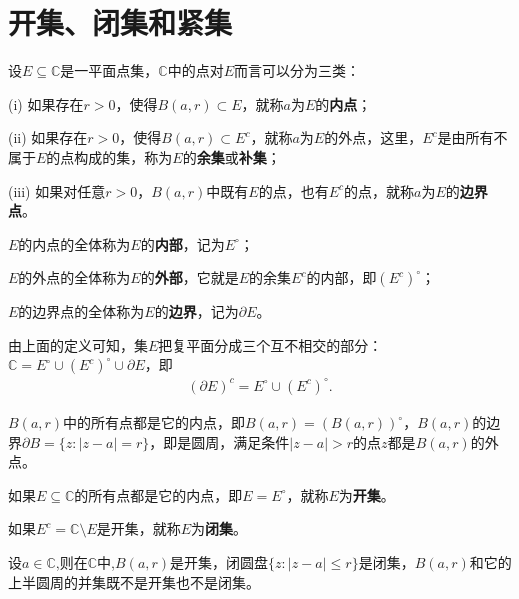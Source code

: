 \documentclass[../../main.tex]{subfiles}%
\begin{document}
\section{开集、闭集和紧集}

\begin{definition}
设\(E\subseteq \mathbb{C}\)是一平面点集，\(\mathbb{C}\)中的点对\(E\)而言可以分为三类：

(i) 如果存在\(r > 0\)，使得\(B(a, r) \subset E\)，就称\(a\)为\(E\)的\textbf{内点}；

(ii) 如果存在\(r > 0\)，使得\(B(a, r) \subset E^c\)，就称\(a\)为\(E\)的外点，这里，\(E^c\)是由所有不属于\(E\)的点构成的集，称为\(E\)的\textbf{余集}或\textbf{补集}；

(iii) 如果对任意\(r > 0\)，\(B(a, r)\)中既有\(E\)的点，也有\(E^c\)的点，就称\(a\)为\(E\)的\textbf{边界点}。

\(E\)的内点的全体称为\(E\)的\textbf{内部}，记为\(E^\circ\)；

\(E\)的外点的全体称为\(E\)的\textbf{外部}，它就是\(E\)的余集\(E^c\)的内部，即\((E^c)^\circ\)；

\(E\)的边界点的全体称为\(E\)的\textbf{边界}，记为\(\partial E\)。
\end{definition}
\begin{remark}
由上面的定义可知，集\(E\)把复平面分成三个互不相交的部分：\(\mathbb{C} = E^\circ \cup (E^c)^\circ \cup \partial E\)，即
\begin{align}\label{equation:::2318}
(\partial E)^c = E^\circ \cup (E^c)^\circ. 
\end{align}
\end{remark}

\begin{example}[邻域的内部和边界]
\(B(a, r)\)中的所有点都是它的内点，即\(B(a, r) = (B(a, r))^\circ\)，\(B(a, r)\)的边界\(\partial B = \{ z : | z - a | = r \}\)，即是圆周，满足条件\(| z - a | > r\)的点\(z\)都是\(B(a, r)\)的外点。
\end{example}

\begin{definition}
如果\(E\subseteq \mathbb{C}\)的所有点都是它的内点，即\(E = E^\circ\)，就称\(E\)为\textbf{开集}。

如果\(E^c=\mathbb{C}\setminus E\)是开集，就称\(E\)为\textbf{闭集}。
\end{definition}

\begin{example}
设$a\in \mathbb{C}$,则在$\mathbb{C}$中,\(B(a, r)\)是开集，闭圆盘\(\{ z : | z - a | \leqslant r \}\)是闭集，\(B(a, r)\)和它的上半圆周的并集既不是开集也不是闭集。
\end{example}
\end{document}
